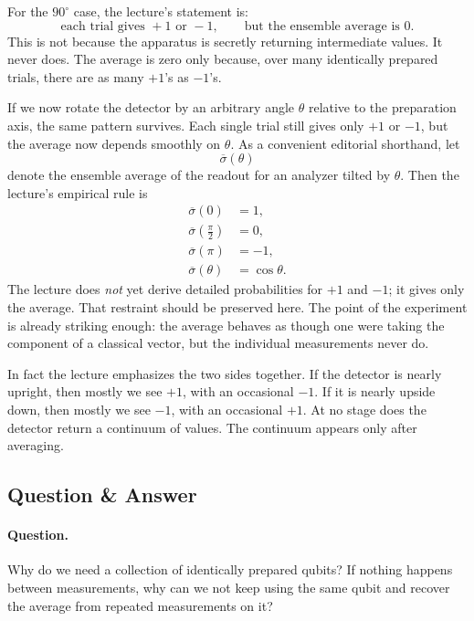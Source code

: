 For the \(90^\circ\) case, the lecture's statement is:
\begin{equation}
\text{each trial gives }+1\text{ or }-1,
\qquad
\text{but the ensemble average is }0.
\end{equation}
This is not because the apparatus is secretly returning intermediate values.
It never does.
The average is zero only because, over many identically prepared trials, there are as many \(+1\)'s as \(-1\)'s.

If we now rotate the detector by an arbitrary angle \(\theta\) relative to the preparation axis, the same pattern survives. Each single trial still gives only \(+1\) or \(-1\), but the average now depends smoothly on \(\theta\). As a convenient editorial shorthand, let
\begin{equation}
\overline{\sigma}(\theta)
\end{equation}
denote the ensemble average of the readout for an analyzer tilted by \(\theta\). Then the lecture's empirical rule is
\begin{align}
\overline{\sigma}(0) &= 1,\\
\overline{\sigma}\!\left(\frac{\pi}{2}\right) &= 0,\\
\overline{\sigma}(\pi) &= -1,\\
\overline{\sigma}(\theta) &= \cos\theta.
\end{align}
The lecture does \emph{not} yet derive detailed probabilities for \(+1\) and \(-1\); it gives only the average. That restraint should be preserved here. The point of the experiment is already striking enough: the average behaves as though one were taking the component of a classical vector, but the individual measurements never do.

In fact the lecture emphasizes the two sides together. If the detector is nearly upright, then mostly we see \(+1\), with an occasional \(-1\). If it is nearly upside down, then mostly we see \(-1\), with an occasional \(+1\). At no stage does the detector return a continuum of values. The continuum appears only after averaging.

\subsection{Question \& Answer}

\paragraph{Question.} Why do we need a collection of identically prepared qubits? If nothing happens between measurements, why can we not keep using the same qubit and recover the average from repeated measurements on it?

